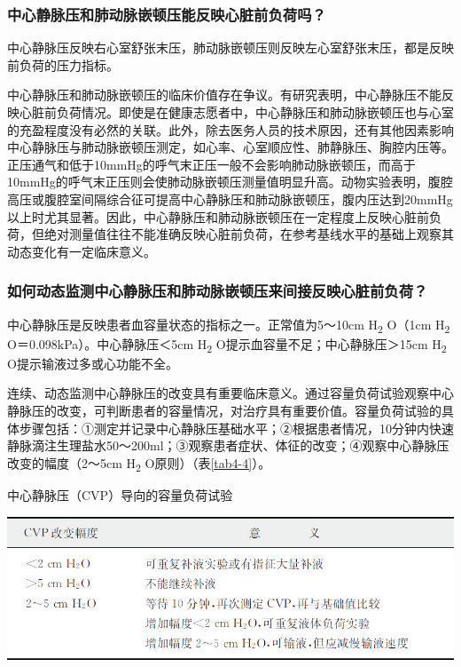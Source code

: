 \subsubsection{中心静脉压和肺动脉嵌顿压能反映心脏前负荷吗？}

中心静脉压反映右心室舒张末压，肺动脉嵌顿压则反映左心室舒张末压，都是反映前负荷的压力指标。

中心静脉压和肺动脉嵌顿压的临床价值存在争议。有研究表明，中心静脉压不能反映心脏前负荷情况。即使是在健康志愿者中，中心静脉压和肺动脉嵌顿压也与心室的充盈程度没有必然的关联。此外，除去医务人员的技术原因，还有其他因素影响中心静脉压与肺动脉嵌顿压测定，如心率、心室顺应性、肺静脉压、胸腔内压等。正压通气和低于10mmHg的呼气末正压一般不会影响肺动脉嵌顿压，而高于10mmHg的呼气末正压则会使肺动脉嵌顿压测量值明显升高。动物实验表明，腹腔高压或腹腔室间隔综合征可提高中心静脉压和肺动脉嵌顿压，腹内压达到20mmHg以上时尤其显著。因此，中心静脉压和肺动脉嵌顿压在一定程度上反映心脏前负荷，但绝对测量值往往不能准确反映心脏前负荷，在参考基线水平的基础上观察其动态变化有一定临床意义。

\subsubsection{如何动态监测中心静脉压和肺动脉嵌顿压来间接反映心脏前负荷？}

中心静脉压是反映患者血容量状态的指标之一。正常值为5～10cm
H\textsubscript{2} O（1cm H\textsubscript{2}
O＝0.098kPa）。中心静脉压＜5cm H\textsubscript{2}
O提示血容量不足；中心静脉压＞15cm H\textsubscript{2}
O提示输液过多或心功能不全。

连续、动态监测中心静脉压的改变具有重要临床意义。通过容量负荷试验观察中心静脉压的改变，可判断患者的容量情况，对治疗具有重要价值。容量负荷试验的具体步骤包括：①测定并记录中心静脉压基础水平；②根据患者情况，10分钟内快速静脉滴注生理盐水50～200ml；③观察患者症状、体征的改变；④观察中心静脉压改变的幅度（2～5cm
H\textsubscript{2} O原则）（表\ref{tab4-4}）。

\begin{table}[htbp]
\centering
\caption{中心静脉压（CVP）导向的容量负荷试验}
\label{tab4-4}
\includegraphics{./images/Image00039.jpg}
\end{table}

